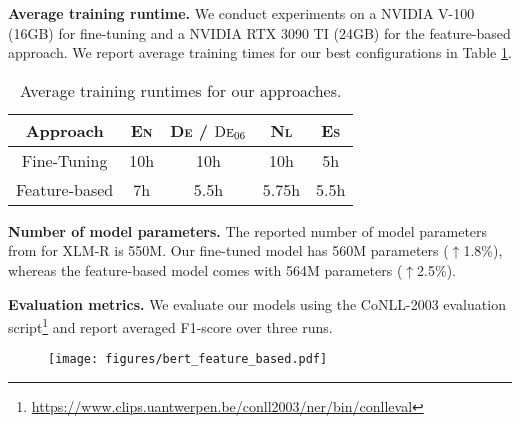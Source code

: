 \documentclass[11pt,a4paper]{article}
\begin{document}
\noindent
\textbf{Average training runtime.} We conduct experiments on a NVIDIA V-100 (16GB) for fine-tuning and a NVIDIA RTX 3090 TI (24GB) for the feature-based approach. We report average training times for our best configurations in Table \ref{tab:training_runtimes}.

\begin{table}[h!]
\centering
\begin{tabular}{ccccc}
\hline
 Approach       &  \textsc{En} & \textsc{De} / $\textsc{De}_{06}$ & \textsc{Nl} & \textsc{Es} \\ \hline
 Fine-Tuning    &  10h            & 10h                        & 10h             &  5h \\
 Feature-based  &  7h          &  5.5h                 &  5.75h      & 5.5h \\
 \hline
\end{tabular}\caption{Average training runtimes for our approaches.}
\label{tab:training_runtimes}
\end{table}

\noindent
\textbf{Number of model parameters.} The reported number of model parameters from \citet{conneau2019unsupervised} for XLM-R is 550M. Our fine-tuned model has 560M parameters ($\uparrow$1.8\%), whereas the feature-based model comes with 564M parameters ($\uparrow$2.5\%).

\noindent
\textbf{Evaluation metrics.} We evaluate our models using the CoNLL-2003 evaluation script\footnote{\url{https://www.clips.uantwerpen.be/conll2003/ner/bin/conlleval}} and report averaged F1-score over three runs.











\begin{figure*}[t]
 \centering
 \texttt{[image: figures/bert\_feature\_based.pdf]}
 \label{overview-bert-feature-based-document-level}
\end{figure*}
\end{document}

